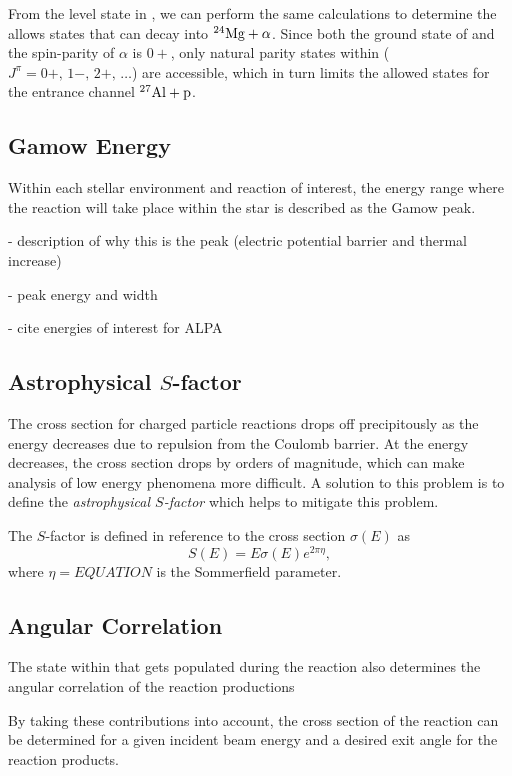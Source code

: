 From the level state in , we can perform the same calculations to
determine the allows states that can decay into ${}^{24}\textrm{Mg} + \alpha$. Since
both the ground state of  and the spin-parity of $\alpha$ is $0+$,
only natural parity states within 
($J^{\pi} = 0+,\, 1-,\, 2+,\, \ldots$) are accessible, which in turn limits the
allowed states for the entrance channel ${}^{27}\textrm{Al} + \rm{p}$.

\subsection{Gamow Energy}

Within each stellar environment and reaction of interest, the energy range
where the reaction will take place within the star is described as the Gamow
peak.

- description of why this is the peak (electric potential barrier and thermal increase)

- peak energy and width

- cite energies of interest for ALPA

\subsection{Astrophysical $S$-factor}

The cross section for charged particle reactions drops off precipitously as
the energy decreases due to repulsion from the Coulomb barrier. At the energy
decreases, the cross section drops by orders of magnitude, which can make
analysis of low energy phenomena more difficult. A solution to this problem is
to define the \emph{astrophysical $S$-factor} which helps to mitigate this
problem.

The $S$-factor is defined in reference to the cross section $\sigma(E)$ as
\[
    S(E) = E\sigma(E)e^{2\pi\eta},
\]
where $\eta = EQUATION$ is the Sommerfield parameter.


\subsection{Angular Correlation}
The state within  that gets populated during the reaction also
determines the angular correlation of the reaction productions

By taking these contributions into account, the cross section of the reaction
can be determined for a given incident beam energy and a desired exit angle for
the reaction products.

